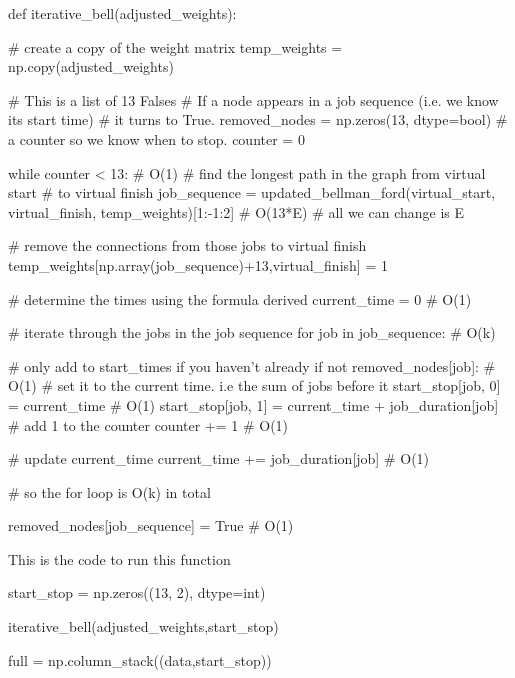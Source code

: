 \documentclass[paper=a4, fontsize=12pt]{scrartcl} %
\numberwithin{equation}{section}       %
\numberwithin{figure}{section}         %
\numberwithin{table}{section}          %
\begin{document}
\begin{python}
def iterative_bell(adjusted_weights):

    # create a copy of the weight matrix
    temp_weights = np.copy(adjusted_weights)

    # This is a list of 13 Falses
    # If a node appears in a job sequence (i.e. we know its start time)
    # it turns to True.
    removed_nodes = np.zeros(13, dtype=bool)
    # a counter so we know when to stop.
    counter = 0

    while counter < 13:  # O(1)
        # find the longest path in the graph from virtual start
        # to virtual finish
        job_sequence = updated_bellman_ford(virtual_start,
                                            virtual_finish,
                                            temp_weights)[1:-1:2]
        # O(13*E) # all we can change is E


        # remove the connections from those jobs to virtual finish
        temp_weights[np.array(job_sequence)+13,virtual_finish] = 1

        # determine the times using the formula derived
        current_time = 0  # O(1)

        # iterate through the jobs in the job sequence
        for job in job_sequence:  # O(k)

            # only add to start_times if you haven't already
            if not removed_nodes[job]:  # O(1)
                # set it to the current time. i.e the sum of jobs before it
                start_stop[job, 0] = current_time  # O(1)
                start_stop[job, 1] = current_time + job_duration[job]
                # add 1 to the counter
                counter += 1  # O(1)

            # update current_time
            current_time += job_duration[job]  # O(1)

        # so the for loop is O(k) in total

        removed_nodes[job_sequence] = True  # O(1)
\end{python}

This is the code to run this function

\begin{python}
    start_stop = np.zeros((13, 2), dtype=int)

    iterative_bell(adjusted_weights,start_stop)

    full = np.column_stack((data,start_stop))
\end{python}
\end{document}
